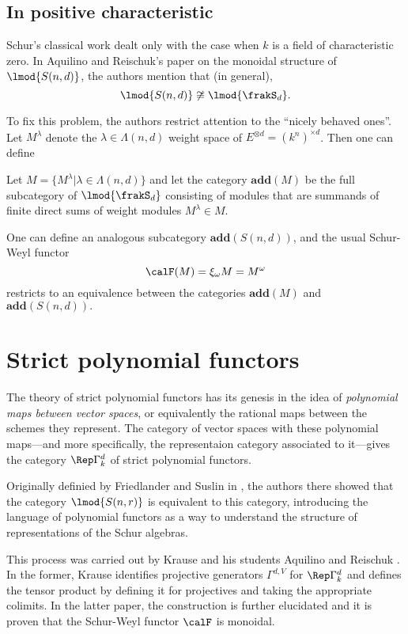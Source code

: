 \documentclass[12pt]{article}
\begin{document}
\subsection{In positive characteristic}
Schur's classical work dealt only with the case when $k$ is a field of characteristic zero. In Aquilino and Reischuk's paper \cite{aquilino-reischuk} 
on the monoidal structure of $\lmod{S(n,d)}$, the authors mention that (in general),
\[\lmod{S(n,d)}\not\cong\lmod{\frakS_d}.\]

To fix this problem, the authors restrict attention to the ``nicely behaved ones''. Let $M^\lambda$ denote 
the $\lambda\in\Lambda(n,d)$ weight space of $E^{\otimes d}=(k^n)^{\times d}$. Then one can define 
\begin{defn}
	Let $M=\{M^\lambda|\lambda\in\Lambda(n,d)\}$ and let the category $\mathbf{add}(M)$ be the full subcategory of $\lmod{\frakS_d}$ consisting 
	of modules that are summands of finite direct sums of weight modules $M^\lambda\in M$.
\end{defn}
One can define an analogous subcategory $\mathbf{add}(S(n,d))$, and the usual Schur-Weyl functor 
\[\calF(M)=\xi_\omega M=M^\omega\]
restricts to an equivalence between the categories $\mathbf{add}(M)$ and $\mathbf{add}(S(n,d)).$


\newpage
\section{Strict polynomial functors}
The theory of strict polynomial functors has its genesis in the idea of \textit{polynomial maps between vector spaces},
or equivalently the rational maps between the schemes they represent. The category of vector spaces with these polynomial maps---and 
more specifically, the representaion category associated to it---gives the category $\Rep \Gamma^d_k$ of strict polynomial functors. 

Originally definied by Friedlander and Suslin in \cite{friedlander-suslin}, the authors there showed that 
the category $\lmod{S(n,r)}$ is equivalent to this category, introducing the language of polynomial functors as 
a way to understand the structure of representations of the Schur algebras. 

This process was carried out by Krause \cite{krause-strict-poly-func} and his students Aquilino and Reischuk \cite{aquilino-reischuk}.
In the former, Krause identifies projective generators $\Gamma^{d,V}$ for $\Rep\Gamma^d_k$ and defines the tensor product 
by defining it for projectives and taking the appropriate colimits. In the latter paper, the construction 
is further elucidated and it is proven that the Schur-Weyl functor $\calF$ is monoidal.
\end{document}
